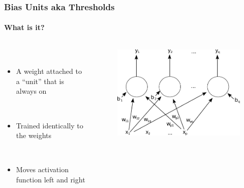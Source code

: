 \documentclass{beamer}
\newcommand{\figheight}{0.72\textheight}
\begin{document}
\begin{frame}[fragile]
\frametitle{Bias Units aka Thresholds}
\framesubtitle{What is it?}
 \begin{columns}[T]
    \begin{column}{.45\textwidth} 
             \  \\

     
\begin{itemize}[<+->]

\item A weight attached to a ``unit'' that is always on

\ \\

\item Trained identically to the weights


\ \\

\item Moves activation function left and right

 
\end{itemize}
\end{column}
\begin{column}{.55\textwidth}
\begin{figure}[t]
 \begin{flushleft}

 \includegraphics[scale=.65]{fig/Single_layer_ann.pdf}

 \end{flushleft}
\end{figure}
\end{column}

\end{columns}
\end{frame}
\end{document}
